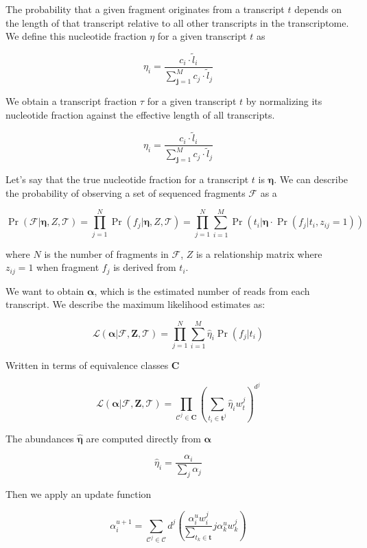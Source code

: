The probability that a given fragment originates from a transcript \(t\)
depends on the length of that transcript relative to all other
transcripts in the transcriptome. We define this nucleotide fraction
\(\eta\) for a given transcript \(t\) as

\[\eta_i= \dfrac{c_i \cdot \tilde l _i}{\sum^{M}_{\pmb{j} = 1}c_j \cdot \tilde l _j}\]

We obtain a transcript fraction \(\tau\) for a given transcript \(t\) by
normalizing its nucleotide fraction against the effective length of all
transcripts.

\[\eta_i= \dfrac{c_i \cdot \tilde l _i}{\sum^{M}_{\pmb{j} = 1}c_j \cdot \tilde l _j}\]

Let's say that the true nucleotide fraction for a transcript \(t\) is
\(\pmb{\eta}\). We can describe the probability of observing a set of
sequenced fragments \(\mathcal{F}\) as a

\[\Pr\left( \mathcal{F}| \pmb{\eta}, Z, \mathcal{T} \right) = \prod^{N}_{j=1} \Pr\left( f_j| \pmb{\eta}, Z, \mathcal{T} \right) = \prod^{N}_{j=1}\sum^{M}_{i=1} \Pr\left( t_i| \pmb{\eta} \cdot \Pr\left( f_j|t_i,z _{ij} =1 \right)  \right)\]

where \(N\) is the number of fragments in \(\mathcal{F}\), \(Z\) is a
relationship matrix where \(z _{ij} =1\) when fragment \(f_j\) is
derived from \(t_i\).

We want to obtain \(\pmb{\alpha}\), which is the estimated number of
reads from each transcript. We describe the maximum likelihood estimates
as:

\[\mathcal{L} \left( \pmb{\alpha} |\mathcal{F}, \pmb{Z},\mathcal{T} \right)  = \prod^{N}_{j=1} \sum^{M}_{i=1} \hat \eta_i \Pr\left(  f_j|t_i\right)\]

Written in terms of equivalence classes \(\pmb{C}\)

\[\mathcal{L} \left( \pmb{\alpha} |\mathcal{F}, \pmb{Z},\mathcal{T} \right)  = \prod^{}_{\mathcal{C}^j \in \pmb{C}} \left( \sum_{t_i \in  \pmb{t}^j} \hat \eta_i w_t^j\right) ^{d^{j}}\]

The abundances \(\pmb{\hat \eta}\) are computed directly from
\(\pmb{\alpha}\)

\[\hat \eta_i= \dfrac{\alpha_i}{\sum_j \alpha_j}\]

Then we apply an update function

\[\alpha_i ^{u+1} = \sum^{}_{\mathcal{C}^j \in \pmb{\mathcal{C}}} d ^{j} \left( \dfrac{\alpha_i^u w_i^j}{\sum^{}_{t_k \in \pmb{t}}} j \alpha^u_k w_k^j\right)\]

